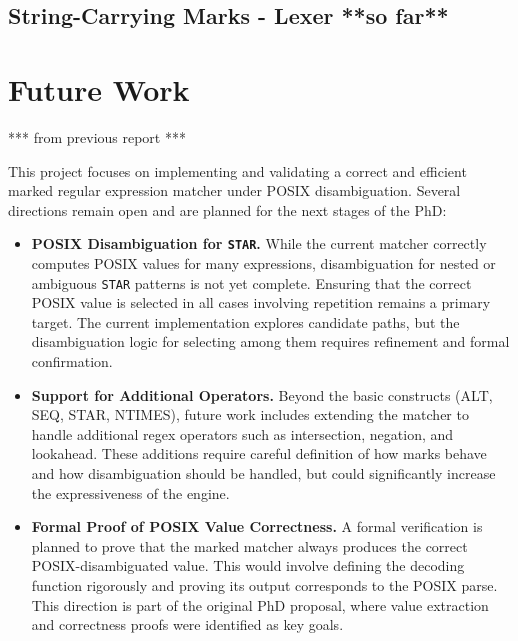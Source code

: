 \documentclass[12pt]{article}
\begin{document}
 
 


\subsection{String-Carrying Marks - Lexer **so far**}

\section{Future Work}
*** from previous report ***

This project focuses on implementing and validating a correct and efficient marked regular expression matcher under POSIX disambiguation. Several directions remain open and are planned for the next stages of the PhD:

\begin{itemize}
\item \textbf{POSIX Disambiguation for \texttt{STAR}.}
While the current matcher correctly computes POSIX values for many expressions, disambiguation for nested or ambiguous \texttt{STAR} patterns is not yet complete. Ensuring that the correct POSIX value is selected in all cases involving repetition remains a primary target. The current implementation explores candidate paths, but the disambiguation logic for selecting among them requires refinement and formal confirmation.

\item \textbf{Support for Additional Operators.}
Beyond the basic constructs (ALT, SEQ, STAR, NTIMES), future work includes extending the matcher to handle additional regex operators such as intersection, negation, and lookahead. These additions require careful definition of how marks behave and how disambiguation should be handled, but could significantly increase the expressiveness of the engine.

\item \textbf{Formal Proof of POSIX Value Correctness.}
A formal verification is planned to prove that the marked matcher always produces the correct POSIX-disambiguated value. This would involve defining the decoding function rigorously and proving its output corresponds to the POSIX parse. This direction is part of the original PhD proposal, where value extraction and correctness proofs were identified as key goals.


\end{itemize}




\end{document}
